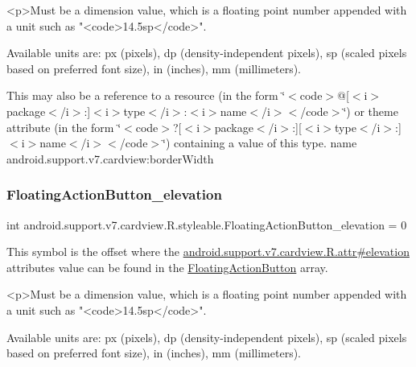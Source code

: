 \begin{DoxyVerb}      <p>Must be a dimension value, which is a floating point number appended with a unit such as "<code>14.5sp</code>".
\end{DoxyVerb}
 Available units are\+: px (pixels), dp (density-\/independent pixels), sp (scaled pixels based on preferred font size), in (inches), mm (millimeters). 

This may also be a reference to a resource (in the form \char`\"{}$<$code$>$@\mbox{[}$<$i$>$package$<$/i$>$\+:\mbox{]}$<$i$>$type$<$/i$>$\+:$<$i$>$name$<$/i$>$$<$/code$>$\char`\"{}) or theme attribute (in the form \char`\"{}$<$code$>$?\mbox{[}$<$i$>$package$<$/i$>$\+:\mbox{]}\mbox{[}$<$i$>$type$<$/i$>$\+:\mbox{]}$<$i$>$name$<$/i$>$$<$/code$>$\char`\"{}) containing a value of this type.  name android.\+support.\+v7.\+cardview\+:border\+Width \mbox{\label{classandroid_1_1support_1_1v7_1_1cardview_1_1R_1_1styleable_a477d324687e0fa87caccb4664d67dbc8}} 
\subsubsection{\texorpdfstring{Floating\+Action\+Button\+\_\+elevation}{FloatingActionButton\_elevation}}
{\footnotesize\ttfamily int android.\+support.\+v7.\+cardview.\+R.\+styleable.\+Floating\+Action\+Button\+\_\+elevation = 0\hspace{0.3cm}{\ttfamily [static]}}

This symbol is the offset where the \hyperlink{classandroid_1_1support_1_1v7_1_1cardview_1_1R_1_1attr_af8da2ee4ea221f8d413747edbfbf8ccb}{android.\+support.\+v7.\+cardview.\+R.\+attr\#elevation} attribute\textquotesingle{}s value can be found in the \hyperlink{classandroid_1_1support_1_1v7_1_1cardview_1_1R_1_1styleable_a1be8c9bcabd399162362befcccf73f59}{Floating\+Action\+Button} array.

\begin{DoxyVerb}      <p>Must be a dimension value, which is a floating point number appended with a unit such as "<code>14.5sp</code>".
\end{DoxyVerb}
 Available units are\+: px (pixels), dp (density-\/independent pixels), sp (scaled pixels based on preferred font size), in (inches), mm (millimeters). 

